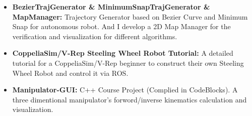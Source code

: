 \documentclass[11pt,a4paper,sans]{moderncv}        %
\begin{document}
{\begin{itemize}

\vspace{6pt}

\item \textbf{BezierTrajGenerator \& MinimumSnapTrajGenerator \& 
MapManager:} Trajectory Generator based on Bezier Curve and Minimum Snap for autonomous robot. And I develop a 2D Map Manager for the verification and visualization for different algorithms.


\vspace{6pt}

\item \textbf{CoppeliaSim/V-Rep Steeling Wheel Robot Tutorial:} A detailed tutorial for a CoppeliaSim/V-Rep beginner to construct their own Steeling Wheel Robot and control it via ROS.

\vspace{6pt}

\item \textbf{Manipulator-GUI:} C++ Course Project (Complied in CodeBlocks). A three dimentional manipulator's forword/inverse kinematics calculation and visualization.


\end{itemize}


}
\end{document}
